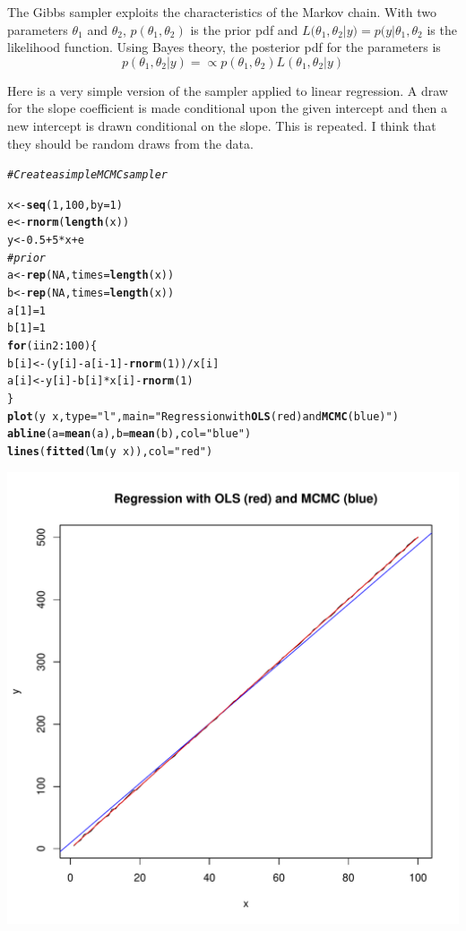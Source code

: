 \documentclass[12pt, a4paper, oneside]{article}\usepackage[]{graphicx}\usepackage[]{color}
\makeatletter
\def\maxwidth{ %
  \ifdim\Gin@nat@width>\linewidth
    \linewidth
  \else
    \Gin@nat@width
  \fi
}
\newcommand{\hlstr}[1]{\textcolor[rgb]{0.192,0.494,0.8}{#1}}%
\newcommand{\hlcom}[1]{\textcolor[rgb]{0.678,0.584,0.686}{\textit{#1}}}%
\newcommand{\hlkwd}[1]{\textcolor[rgb]{0.737,0.353,0.396}{\textbf{#1}}}%
\newenvironment{kframe}{%
 \def\at@end@of@kframe{}%
 \ifinner\ifhmode%
  \def\at@end@of@kframe{\end{minipage}}%
  \begin{minipage}{\columnwidth}%
 \fi\fi%
 \def\FrameCommand##1{\hskip\@totalleftmargin \hskip-\fboxsep
 \colorbox{shadecolor}{##1}\hskip-\fboxsep
     \hskip-\linewidth \hskip-\@totalleftmargin \hskip\columnwidth}%
 \MakeFramed {\advance\hsize-\width
   \@totalleftmargin\z@ \linewidth\hsize
   \@setminipage}}%
 {\par\unskip\endMakeFramed%
 \at@end@of@kframe}
\newenvironment{knitrout}{}{} %
\makeatother
\begin{document}
The Gibbs sampler exploits the characteristics of the Markov chain.  With two parameters $\theta_1$ and $\theta_2$, $p(\theta_1, \theta_2)$ is the prior pdf and $L(\theta_1, \theta_2 | y) = p(y | \theta_1, \theta_2$ is the likelihood function.  Using Bayes theory, the posterior pdf for the parameters is 
\begin{equation}
p(\theta_1, \theta_2| y) = \propto p(\theta_1, \theta_2)L(\theta_1, \theta_2| y)
\end{equation}

Here is a very simple version of the sampler applied to linear regression.  A draw for the slope coefficient is made conditional upon the given intercept and then a new intercept is drawn conditional on the slope.  This is repeated.  I think that they should be random draws from the data.  

\begin{knitrout}
\color{fgcolor}\begin{kframe}
\begin{alltt}
\hlcom{# Create a simple MCMC sampler}

x <- \hlkwd{seq}(1, 100, by = 1)
e <- \hlkwd{rnorm}(\hlkwd{length}(x))
y <- 0.5 + 5 * x + e
\hlcom{# prior}
a <- \hlkwd{rep}(NA, times = \hlkwd{length}(x))
b <- \hlkwd{rep}(NA, times = \hlkwd{length}(x))
a[1] = 1
b[1] = 1
\hlkwd{for} (i in 2:100) \{
    b[i] <- (y[i] - a[i - 1] - \hlkwd{rnorm}(1))/x[i]
    a[i] <- y[i] - b[i] * x[i] - \hlkwd{rnorm}(1)
\}
\hlkwd{plot}(y ~ x, type = \hlstr{"l"}, main = \hlstr{"Regression with \hlkwd{OLS} (red) and \hlkwd{MCMC} (blue)"})
\hlkwd{abline}(a = \hlkwd{mean}(a), b = \hlkwd{mean}(b), col = \hlstr{"blue"})
\hlkwd{lines}(\hlkwd{fitted}(\hlkwd{lm}(y ~ x)), col = \hlstr{"red"})
\end{alltt}
\end{kframe}
\includegraphics[width=\maxwidth]{figure/MCMC} 

\end{knitrout}
\end{document}
